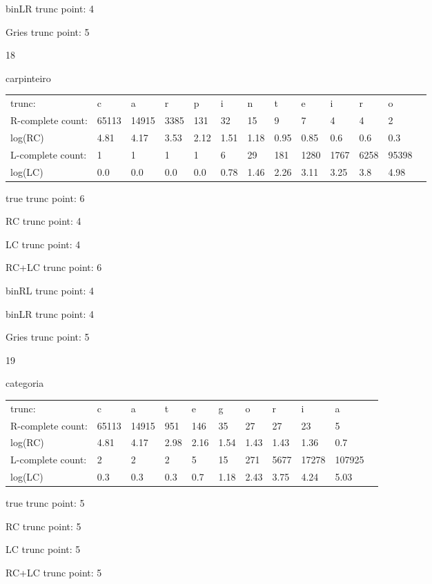 \documentclass[10pt]{article}
\begin{document}
binLR trunc point: 4

Gries trunc point: 5

\vspace{1em}

18

carpinteiro

\begin{tabular}{l|llllllllllll}
trunc: & c & a & r & p & i & n & t & e & i & r & o & \\ 
R-complete count: & 65113 & 14915 & 3385 & 131 & 32 & 15 & 9 & 7 & 4 & 4 & 2 & \\ 
log(RC) & 4.81 & 4.17 & 3.53 & 2.12 & 1.51 & 1.18 & 0.95 & 0.85 & 0.6 & 0.6 & 0.3 & \\ 
L-complete count: & 1 & 1 & 1 & 1 & 6 & 29 & 181 & 1280 & 1767 & 6258 & 95398 & \\ 
log(LC) & 0.0 & 0.0 & 0.0 & 0.0 & 0.78 & 1.46 & 2.26 & 3.11 & 3.25 & 3.8 & 4.98 & \\ 
\end{tabular}

true trunc point: 6

RC trunc point: 4

LC trunc point: 4

RC+LC trunc point: 6

binRL trunc point: 4

binLR trunc point: 4

Gries trunc point: 5

\vspace{1em}

19

categoria

\begin{tabular}{l|llllllllll}
trunc: & c & a & t & e & g & o & r & i & a & \\ 
R-complete count: & 65113 & 14915 & 951 & 146 & 35 & 27 & 27 & 23 & 5 & \\ 
log(RC) & 4.81 & 4.17 & 2.98 & 2.16 & 1.54 & 1.43 & 1.43 & 1.36 & 0.7 & \\ 
L-complete count: & 2 & 2 & 2 & 5 & 15 & 271 & 5677 & 17278 & 107925 & \\ 
log(LC) & 0.3 & 0.3 & 0.3 & 0.7 & 1.18 & 2.43 & 3.75 & 4.24 & 5.03 & \\ 
\end{tabular}

true trunc point: 5

RC trunc point: 5

LC trunc point: 5

RC+LC trunc point: 5
\end{document}
